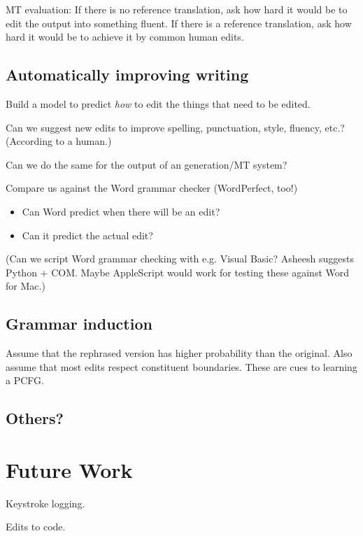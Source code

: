 \documentclass[11pt]{article}
\begin{document}
MT evaluation: If there is no reference translation, ask how hard it
would be to edit the output into something fluent.  If there is a
reference translation, ask how hard it would be to achieve it by
common human edits.

\subsection{Automatically improving writing}

Build a model to predict {\em how} to edit the things
that need to be edited.

Can we suggest new edits to improve spelling, punctuation, style,
fluency, etc.?  (According to a human.)

Can we do the same for the output of an generation/MT system?

Compare us against the Word grammar checker (WordPerfect, too!)
\begin{itemize}
\item Can Word predict when there will be an edit?
\item Can it predict the actual edit?
\end{itemize}
(Can we script Word grammar checking with e.g. Visual Basic?  Asheesh
suggests Python + COM.  Maybe AppleScript would work for testing these
against Word for Mac.)

\subsection{Grammar induction}

Assume that the rephrased version has higher probability than
the original.  Also assume that most edits respect constituent 
boundaries.  These are cues to learning a PCFG.

\subsection{Others?}

\section{Future Work}

Keystroke logging.

Edits to code.


% 
\end{document}
